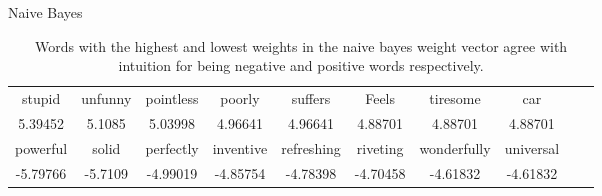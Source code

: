 \documentclass[11pt]{article}
\begin{document}
\begin{subsection}{Naive Bayes}
\begin{table}[h]
\centering
\begin{tabular}{cccccccccc}
 \midrule
 stupid & unfunny& pointless  & poorly & suffers & Feels & tiresome & car \\
   5.39452 & 5.1085& 5.03998 &4.96641&4.96641 & 4.88701 & 4.88701 & 4.88701 \\
 \bottomrule
 \bottomrule
 powerful  & solid& perfectly & inventive & refreshing & riveting & wonderfully & universal \\
  -5.79766 & -5.7109 & -4.99019 & -4.85754 & -4.78398 & -4.70458 & -4.61832 & -4.61832 \\
 \bottomrule
\end{tabular}
\caption{\label{tab:nbwords} Words with the highest and lowest weights in the naive bayes weight vector agree with intuition for being negative and positive words respectively.}
\end{table}

\end{subsection}
\end{document}
